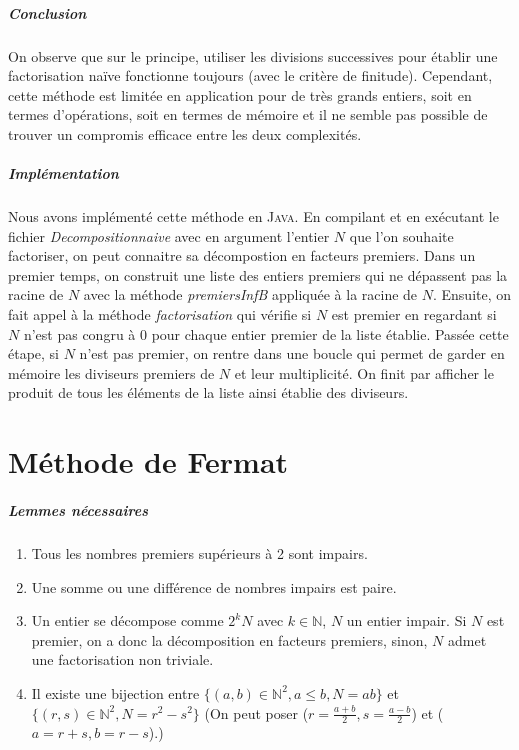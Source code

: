 \documentclass[11pt,a4paper]{article}
\begin{document}
	\subparagraph{Conclusion}
	
	On observe que sur le principe, utiliser les divisions successives pour établir une factorisation naïve fonctionne toujours (avec le critère de finitude). Cependant, cette méthode est limitée en application pour de très grands entiers, soit en termes d'opérations, soit en termes de mémoire et il ne semble pas possible de trouver un compromis efficace entre les deux complexités.
	
	\subparagraph{Implémentation}
	Nous avons implémenté cette méthode en \textsc{Java}. En compilant et en exécutant le fichier \textit{Decompositionnaive} avec en argument l'entier $N$ que l'on souhaite factoriser, on peut connaitre sa décompostion en facteurs premiers. Dans un premier temps, on construit une liste des entiers premiers qui ne dépassent pas la racine de $N$ avec la méthode \textit{premiersInfB} appliquée à la racine de $N$. Ensuite, on fait appel à la méthode \textit{factorisation} qui vérifie si $N$ est premier en regardant si $N$ n'est pas congru à 0 pour chaque entier premier de la liste établie. Passée cette étape, si $N$ n'est pas premier, on rentre dans une boucle qui permet de garder en mémoire les diviseurs premiers de $N$ et leur multiplicité. On finit par afficher le produit de tous les éléments de la liste ainsi établie des diviseurs.
	
	\section{\LARGE{Méthode de Fermat}}
	
	\subparagraph{Lemmes nécessaires}
	\begin{enumerate}
		\item Tous les nombres premiers supérieurs à 2 sont impairs.
		
		\item Une somme ou une différence de nombres impairs est paire.
		
		\item Un entier se décompose comme $2^{k}N$ avec $k \in \mathbb{N}$, $N$ un entier impair. Si $N$ est premier, on a donc la décomposition en facteurs premiers, sinon, $N$ admet une factorisation non triviale.
		
		\item Il existe une bijection entre ${\{(a,b) \in \mathbb{N}^2, a \leq b, N = ab\}}$ et $\{(r,s) \in \mathbb{N}^2, N = r^2 - s^2\}$ 
		(On peut poser ($r = \frac{a+b}{2}, s = \frac{a-b}{2}$) et ($a=r+s , b = r-s$).)
	\end{enumerate}
	
\end{document}
